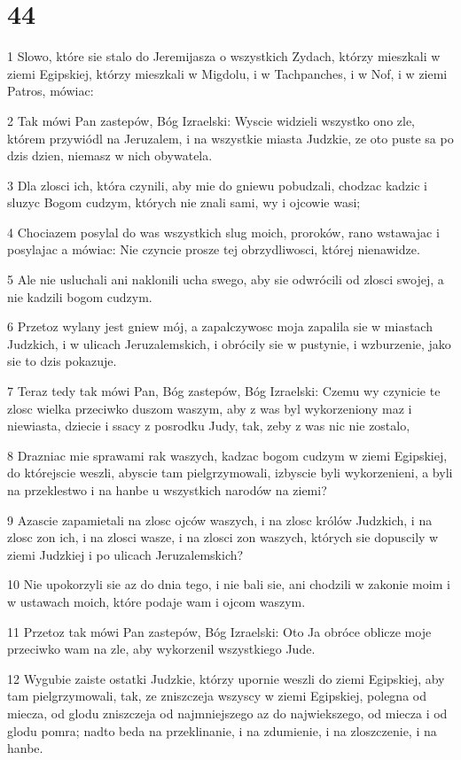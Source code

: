 \chapter{44}

\par 1 Slowo, które sie stalo do Jeremijasza o wszystkich Zydach, którzy mieszkali w ziemi Egipskiej, którzy mieszkali w Migdolu, i w Tachpanches, i w Nof, i w ziemi Patros, mówiac:
\par 2 Tak mówi Pan zastepów, Bóg Izraelski: Wyscie widzieli wszystko ono zle, którem przywiódl na Jeruzalem, i na wszystkie miasta Judzkie, ze oto puste sa po dzis dzien, niemasz w nich obywatela.
\par 3 Dla zlosci ich, która czynili, aby mie do gniewu pobudzali, chodzac kadzic i sluzyc Bogom cudzym, których nie znali sami, wy i ojcowie wasi;
\par 4 Chociazem posylal do was wszystkich slug moich, proroków, rano wstawajac i posylajac a mówiac: Nie czyncie prosze tej obrzydliwosci, której nienawidze.
\par 5 Ale nie usluchali ani naklonili ucha swego, aby sie odwrócili od zlosci swojej, a nie kadzili bogom cudzym.
\par 6 Przetoz wylany jest gniew mój, a zapalczywosc moja zapalila sie w miastach Judzkich, i w ulicach Jeruzalemskich, i obrócily sie w pustynie, i wzburzenie, jako sie to dzis pokazuje.
\par 7 Teraz tedy tak mówi Pan, Bóg zastepów, Bóg Izraelski: Czemu wy czynicie te zlosc wielka przeciwko duszom waszym, aby z was byl wykorzeniony maz i niewiasta, dziecie i ssacy z posrodku Judy, tak, zeby z was nic nie zostalo,
\par 8 Drazniac mie sprawami rak waszych, kadzac bogom cudzym w ziemi Egipskiej, do którejscie weszli, abyscie tam pielgrzymowali, izbyscie byli wykorzenieni, a byli na przeklestwo i na hanbe u wszystkich narodów na ziemi?
\par 9 Azascie zapamietali na zlosc ojców waszych, i na zlosc królów Judzkich, i na zlosc zon ich, i na zlosci wasze, i na zlosci zon waszych, których sie dopuscily w ziemi Judzkiej i po ulicach Jeruzalemskich?
\par 10 Nie upokorzyli sie az do dnia tego, i nie bali sie, ani chodzili w zakonie moim i w ustawach moich, które podaje wam i ojcom waszym.
\par 11 Przetoz tak mówi Pan zastepów, Bóg Izraelski: Oto Ja obróce oblicze moje przeciwko wam na zle, aby wykorzenil wszystkiego Jude.
\par 12 Wygubie zaiste ostatki Judzkie, którzy upornie weszli do ziemi Egipskiej, aby tam pielgrzymowali, tak, ze zniszczeja wszyscy w ziemi Egipskiej, polegna od miecza, od glodu zniszczeja od najmniejszego az do najwiekszego, od miecza i od glodu pomra; nadto beda na przeklinanie, i na zdumienie, i na zloszczenie, i na hanbe.
